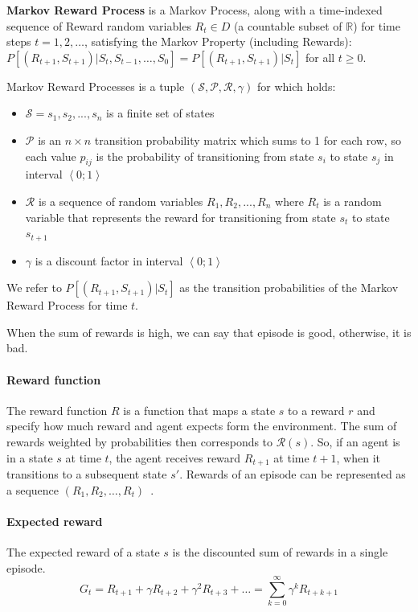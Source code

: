 \documentclass[../xlapes02]{subfiles}
\begin{document}
    \begin{definition}
        \textbf{Markov Reward Process} is a Markov Process, along with a time-indexed sequence of Reward random variables $R_t \in D$ (a countable subset of $\mathbb{R}$) for time steps $t = 1, 2, \ldots$, satisfying the Markov Property (including Rewards): $P[(R_{t+1}, S_{t+1})|S_t, S_{t-1}, \ldots, S_0] = P[(R_{t+1}, S_{t+1})|S_t]$ for all $t \geq 0$.
    \end{definition}

    Markov Reward Processes is a tuple $(\mathcal{S}, \mathcal{P}, \mathcal{R}, \gamma)$ for which holds:
    \begin{itemize}
        \item $\mathcal{S} = s_1, s_2, ..., s_n$ is a finite set of states
        \item $\mathcal{P}$ is an $n\times n$ transition probability matrix which sums to 1 for each row, so each value $p_{ij}$ is the probability of transitioning from state $s_i$ to state $s_j$ in interval $\left< 0;1 \right>$
        \item $\mathcal{R}$ is a sequence of random variables $R_1, R_2, ..., R_n$ where $R_t$ is a random variable that represents the reward for transitioning from state $s_t$ to state $s_{t+1}$
        \item $\gamma$ is a discount factor in interval $\left< 0;1 \right>$
    \end{itemize}

    We refer to $P[(R_{t+1}, S_{t+1})|S_t]$ as the transition probabilities of the Markov Reward Process for time $t$.

    When the sum of rewards is high, we can say that episode is good, otherwise, it is bad.

    \paragraph{Reward function}
    The reward function $R$ is a function that maps a state $s$ to a reward $r$ and specify how much reward and agent expects form the environment. The sum of rewards weighted by probabilities then corresponds to $\mathcal{R}(s)$. So, if an agent is in a state $s$ at time $t$, the agent receives reward  $R_{t+1}$  at time $t + 1$,  when it transitions to a subsequent state $s'$. Rewards of an episode can be represented as a sequence $(R_1, R_2, \ldots, R_t)$~\cite{FITMT25127}.

    \paragraph{Expected reward}
    The expected reward of a state $s$ is the discounted sum of rewards in a single episode.
    \begin{equation}
        G_t = R_{t+1} + \gamma R_{t+2} + \gamma^2 R_{t+3} + \ldots = \sum_{k=0}^{\infty} \gamma^k R_{t+k+1}
    \end{equation}
\end{document}
